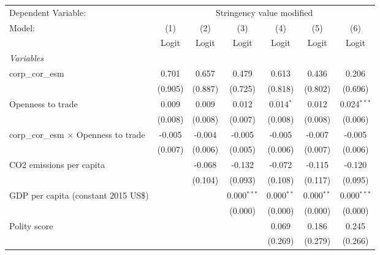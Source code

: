 
\begingroup
\centering
\begin{tabular}{lcccccc}
   \toprule
   Dependent Variable: & \multicolumn{6}{c}{Stringency value modified}\\
   Model:                                       & (1)     & (2)     & (3)           & (4)          & (5)          & (6)\\  
                                                &  Logit  & Logit   & Logit         & Logit        & Logit        & Logit\\  
   \midrule
   \emph{Variables}\\
   corp\_cor\_esm                               & 0.701   & 0.657   & 0.479         & 0.613        & 0.436        & 0.206\\   
                                                & (0.905) & (0.887) & (0.725)       & (0.818)      & (0.802)      & (0.696)\\   
   Openness to trade                            & 0.009   & 0.009   & 0.012         & 0.014$^{*}$  & 0.012        & 0.024$^{***}$\\   
                                                & (0.008) & (0.008) & (0.007)       & (0.008)      & (0.008)      & (0.006)\\   
   corp\_cor\_esm $\times$ Openness to trade    & -0.005  & -0.004  & -0.005        & -0.005       & -0.007       & -0.005\\   
                                                & (0.007) & (0.006) & (0.005)       & (0.006)      & (0.007)      & (0.006)\\   
   CO2 emissions per capita                     &         & -0.068  & -0.132        & -0.072       & -0.115       & -0.120\\   
                                                &         & (0.104) & (0.093)       & (0.108)      & (0.117)      & (0.095)\\   
   GDP per capita (constant 2015 US\$)          &         &         & 0.000$^{***}$ & 0.000$^{**}$ & 0.000$^{**}$ & 0.000$^{***}$\\   
                                                &         &         & (0.000)       & (0.000)      & (0.000)      & (0.000)\\   
   Polity score                                 &         &         &               & 0.069        & 0.186        & 0.245\\   
                                                &         &         &               & (0.269)      & (0.279)      & (0.266)\\   

\end{tabular}
